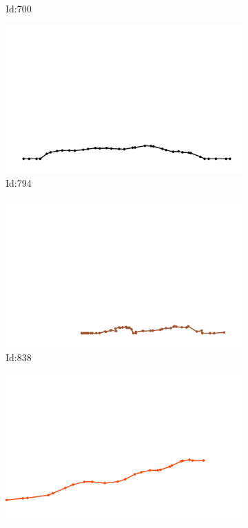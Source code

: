 \documentclass[12pt,twoside]{report}
\begin{document}
\begin{figure}
\begin{subfigure}[b]{0.20\textwidth}
\caption{Id:700}
\end{subfigure}
\begin{subfigure}[b]{0.20\textwidth}
\centering
\includegraphics[width=\textwidth]{../trajectories/794.png}
\caption{Id:794}
\end{subfigure}
\begin{subfigure}[b]{0.20\textwidth}
\centering
\includegraphics[width=\textwidth]{../trajectories/838.png}
\caption{Id:838}
\end{subfigure}
\begin{subfigure}[b]{0.20\textwidth}
\centering
\includegraphics[width=\textwidth]{../trajectories/856.png}

\end{subfigure}
\end{figure}
\end{document}
